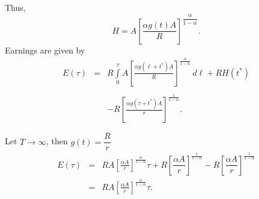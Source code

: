 \documentclass[12pt,compress,handout]{beamer}  %
\begin{document}
\begin{frame}

Thus,
\begin{equation*}
    \dot{H}
    =
    A\left[ \frac{\alpha g(t)A}{R}\right] ^{\dfrac{\alpha }{1-\alpha}}.
\end{equation*}
Earnings are given by
\begin{eqnarray*}
    E(\tau )
    &=&
    R\int\limits_{0}^{\tau}A
        \left[ \frac{\alpha g(\ell + t^{*})A}{R}\right]
        ^{\frac{\alpha }{1-\alpha }}\,d\ell
    +RH(t^{*})\\
    \\
    &&-R\left[ \frac{\alpha g(\tau + t^{*}) A}{r}\right] ^{\frac{1}{1-\alpha }}.
\end{eqnarray*}

\end{frame}


\begin{frame}

Let $T\rightarrow \infty $, then $g(t)=\dfrac{R}{r}$
\begin{eqnarray*}
    E(\tau )
    &=&
    RA\left[ \frac{\alpha A}{r}\right] ^{\frac{\alpha }{1-\alpha }}
    \tau +R\left[ \dfrac{\alpha A}{r}\right] ^{\frac{1}{1-\alpha }}
    -R\left[ \dfrac{\alpha A}{r}\right] ^{\frac{1}{1-\alpha }}\\
    &=&
    RA\left[ \frac{\alpha A}{r}\right] ^{\frac{\alpha }{1-\alpha }}\tau .
\end{eqnarray*}

\end{frame}
\end{document}
